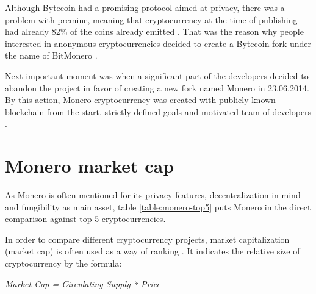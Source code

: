 \documentclass[
  printed, %
  table,   %
  nolof,     %
  nolot,     %
           oneside, color
]{fithesis3}
\begin{document}
Although Bytecoin had a promising protocol aimed at privacy, there was a problem with premine, meaning that cryptocurrency at the time of publishing had already 82\% of the coins already emitted \cite{fluffyponyonbytecoin}.
That was the reason why people interested in anonymous cryptocurrencies decided to create a Bytecoin fork under the name of BitMonero \cite{bitmonero}. 



Next important moment was when a significant part of the developers decided to abandon the project in favor of creating a new fork named Monero in 23.06.2014. By this action, Monero cryptocurrency was created with publicly known blockchain from the start, strictly defined goals and motivated team of developers \cite{monerofork}.


\section{Monero market cap}
 As Monero is often mentioned for its privacy features, decentralization in mind and fungibility as main asset, table \ref{table:monero-top5} puts Monero in the direct comparison against top 5 cryptocurrencies.

In order to compare different cryptocurrency projects, market capitalization (market cap) is often used as a way of ranking \cite{elbahrawy2017evolutionary}. It indicates the relative size of cryptocurrency by the formula: \\\begin{center}
 \textit{\textit{Market Cap = Circulating Supply * Price} }
\end{center}
\end{document}
